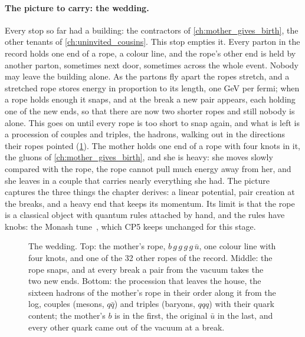 \paragraph{The picture to carry: the wedding.}
Every stop so far had a
building: the contractors of \cref{ch:mother_gives_birth}, the other tenants
of \cref{ch:uninvited_cousins}. This stop empties it. Every parton in the
record holds one end of a rope, a colour line, and the rope's other end is
held by another parton, sometimes next door, sometimes across the whole
event. Nobody may leave the building alone. As the partons fly apart the
ropes stretch, and a stretched rope stores energy in proportion to its
length, one GeV per fermi; when a rope holds enough it snaps, and at the
break a new pair appears, each holding one of the new ends, so that there
are now two shorter ropes and still nobody is alone. This goes on until
every rope is too short to snap again, and what is left is a procession of
couples and triples, the hadrons, walking out in the directions their ropes
pointed (\cref{fig:children_getting_married:wedding_sketch}). The mother holds one end of a rope with four knots in it, the
gluons of \cref{ch:mother_gives_birth}, and she is heavy: she moves slowly
compared with the rope, the rope cannot pull much energy away from her, and
she leaves in a couple that carries nearly everything she had. The picture
captures the three things the chapter derives: a linear potential, pair
creation at the breaks, and a heavy end that keeps its momentum. Its limit
is that the rope is a classical object with quantum rules attached by hand,
and the rules have knobs: the Monash tune~\cite{Skands:2014pea}, which CP5
keeps unchanged for this stage.

\begin{figure}[htbp]\centering
\resizebox{\textwidth}{!}{}
\caption[The wedding: the ropes of the record and the chain of mesons and
baryons]{The wedding. Top: the mother's rope, $b\,g\,g\,g\,g\,\bar u$, one
colour line with four knots, and one of the 32 other ropes of the record.
Middle: the rope snaps, and at every break a pair from the vacuum takes the
two new ends. Bottom: the procession that leaves the house, the sixteen
hadrons of the mother's rope in their order along it from the 
log, couples (mesons, $q\bar q$) and triples (baryons, $qqq$) with their
quark content; the mother's $b$ is in the first, the original $\bar u$ in
the last, and every other quark came out of the vacuum at a break.}
\label{fig:children_getting_married:wedding_sketch}
\end{figure}

